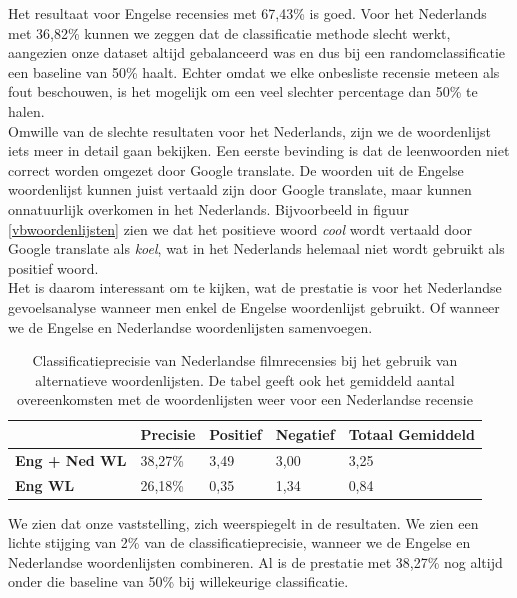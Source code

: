  Het resultaat voor Engelse recensies met 67,43\% is goed. Voor het Nederlands met 36,82\% kunnen we zeggen dat de classificatie methode slecht werkt, aangezien onze dataset altijd gebalanceerd was en dus bij een randomclassificatie een baseline van 50\% haalt. Echter omdat we elke onbesliste recensie meteen als fout beschouwen, is het mogelijk om een veel slechter percentage dan 50\% te halen.\\
 Omwille van de slechte resultaten voor het Nederlands, zijn we de woordenlijst iets meer in detail gaan bekijken. Een eerste bevinding is dat de leenwoorden niet correct worden omgezet door Google translate. De woorden uit de Engelse woordenlijst kunnen juist vertaald zijn door Google translate, maar kunnen onnatuurlijk overkomen in het Nederlands. Bijvoorbeeld in figuur \ref{vbwoordenlijsten} zien we dat het positieve woord \textit{cool} wordt vertaald door Google translate als \textit{koel}, wat in het Nederlands helemaal niet wordt gebruikt als positief woord.\\
 Het is daarom interessant om te kijken, wat de prestatie is voor het Nederlandse gevoelsanalyse wanneer men enkel de Engelse woordenlijst gebruikt. Of wanneer we de Engelse en Nederlandse woordenlijsten samenvoegen.

\begin{table}[h]
\centering
\begin{tabular}{l|l|l|l|l|}
\cline{2-5}
                                         & {\bf Precisie} & {\bf Positief} & {\bf Negatief} & {\bf Totaal Gemiddeld} \\ \hline
\multicolumn{1}{|l|}{{\bf Eng + Ned WL}} & 38,27\%        & 3,49           & 3,00           & 3,25            \\ \hline
\multicolumn{1}{|l|}{{\bf Eng WL}}       & 26,18\%        & 0,35           & 1,34           & 0,84            \\ \hline
\end{tabular}
\caption{Classificatieprecisie van Nederlandse filmrecensies bij het gebruik van alternatieve woordenlijsten. De tabel geeft ook het gemiddeld aantal overeenkomsten met de woordenlijsten weer voor een Nederlandse recensie }
\label{altwoordenlijsten}
\end{table}

We zien dat onze vaststelling, zich weerspiegelt in de resultaten. We zien een lichte stijging van 2\% van de classificatieprecisie, wanneer we de Engelse en Nederlandse woordenlijsten combineren. Al is de prestatie met 38,27\% nog altijd onder die baseline van 50\% bij willekeurige classificatie.

